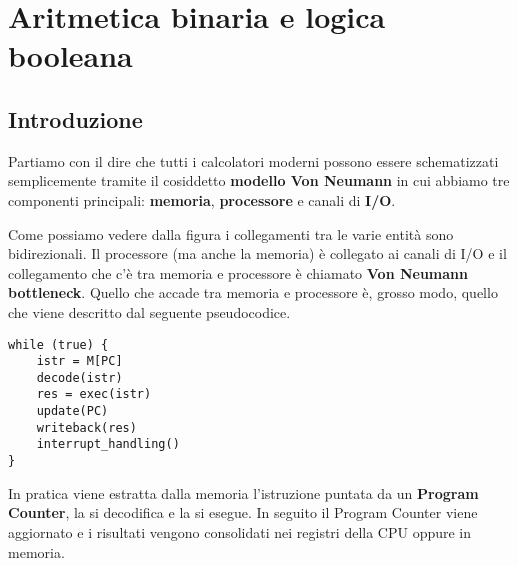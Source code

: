 \chapter{Aritmetica binaria e logica booleana}

\section{Introduzione}
Partiamo con il dire che tutti i calcolatori moderni possono essere schematizzati semplicemente
tramite il cosiddetto \textbf{modello Von Neumann} in cui abbiamo tre componenti principali:
\textbf{memoria}, \textbf{processore} e canali di \textbf{I/O}.

\begin{center}
\end{center}

Come possiamo vedere dalla figura i collegamenti tra le varie entità sono bidirezionali. Il
processore (ma anche la memoria) è collegato ai canali di I/O e il collegamento che c'è tra memoria
e processore è chiamato \textbf{Von Neumann bottleneck}. Quello che accade tra memoria e processore
è, grosso modo, quello che viene descritto dal seguente pseudocodice.

\begin{verbatim}
while (true) {
	istr = M[PC]
	decode(istr)
	res = exec(istr)
	update(PC)
	writeback(res)
	interrupt_handling()
}
\end{verbatim}

In pratica viene estratta dalla memoria l'istruzione puntata da un \textbf{Program Counter}, la
si decodifica e la si esegue. In seguito il Program Counter viene aggiornato e i risultati vengono
consolidati nei registri della CPU oppure in memoria.

